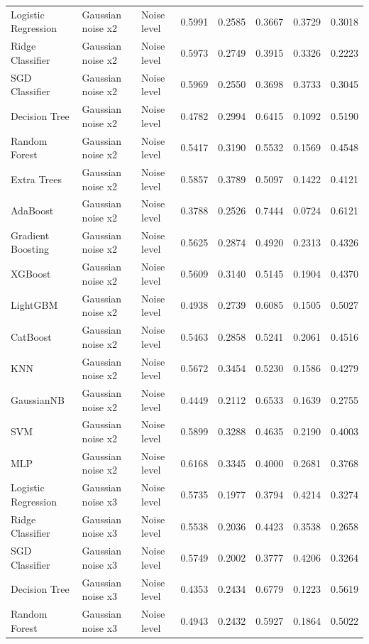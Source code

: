 \begin{tabular}{lllrrrrr}
Logistic Regression & Gaussian noise x2 & Noise level & 0.5991 & 0.2585 & 0.3667 & 0.3729 & 0.3018 \\
Ridge Classifier & Gaussian noise x2 & Noise level & 0.5973 & 0.2749 & 0.3915 & 0.3326 & 0.2223 \\
SGD Classifier & Gaussian noise x2 & Noise level & 0.5969 & 0.2550 & 0.3698 & 0.3733 & 0.3045 \\
Decision Tree & Gaussian noise x2 & Noise level & 0.4782 & 0.2994 & 0.6415 & 0.1092 & 0.5190 \\
Random Forest & Gaussian noise x2 & Noise level & 0.5417 & 0.3190 & 0.5532 & 0.1569 & 0.4548 \\
Extra Trees & Gaussian noise x2 & Noise level & 0.5857 & 0.3789 & 0.5097 & 0.1422 & 0.4121 \\
AdaBoost & Gaussian noise x2 & Noise level & 0.3788 & 0.2526 & 0.7444 & 0.0724 & 0.6121 \\
Gradient Boosting & Gaussian noise x2 & Noise level & 0.5625 & 0.2874 & 0.4920 & 0.2313 & 0.4326 \\
XGBoost & Gaussian noise x2 & Noise level & 0.5609 & 0.3140 & 0.5145 & 0.1904 & 0.4370 \\
LightGBM & Gaussian noise x2 & Noise level & 0.4938 & 0.2739 & 0.6085 & 0.1505 & 0.5027 \\
CatBoost & Gaussian noise x2 & Noise level & 0.5463 & 0.2858 & 0.5241 & 0.2061 & 0.4516 \\
KNN & Gaussian noise x2 & Noise level & 0.5672 & 0.3454 & 0.5230 & 0.1586 & 0.4279 \\
GaussianNB & Gaussian noise x2 & Noise level & 0.4449 & 0.2112 & 0.6533 & 0.1639 & 0.2755 \\
SVM & Gaussian noise x2 & Noise level & 0.5899 & 0.3288 & 0.4635 & 0.2190 & 0.4003 \\
MLP & Gaussian noise x2 & Noise level & 0.6168 & 0.3345 & 0.4000 & 0.2681 & 0.3768 \\
Logistic Regression & Gaussian noise x3 & Noise level & 0.5735 & 0.1977 & 0.3794 & 0.4214 & 0.3274 \\
Ridge Classifier & Gaussian noise x3 & Noise level & 0.5538 & 0.2036 & 0.4423 & 0.3538 & 0.2658 \\
SGD Classifier & Gaussian noise x3 & Noise level & 0.5749 & 0.2002 & 0.3777 & 0.4206 & 0.3264 \\
Decision Tree & Gaussian noise x3 & Noise level & 0.4353 & 0.2434 & 0.6779 & 0.1223 & 0.5619 \\
Random Forest & Gaussian noise x3 & Noise level & 0.4943 & 0.2432 & 0.5927 & 0.1864 & 0.5022 \\

\end{tabular}
